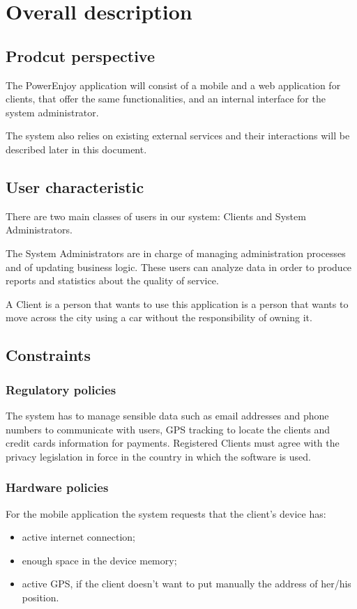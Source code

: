 \chapter{Overall description}

\section{Prodcut perspective}
The PowerEnjoy application will consist of a mobile and a web application for clients, that offer the same functionalities, and an internal interface for the system administrator.

The system also relies on existing external services and their interactions will be described later in this document.

\section{User characteristic}
There are two main classes of users in our system: Clients and System Administrators.

The System Administrators are in charge of managing administration processes and of updating business logic. These users can analyze data in order to produce reports and statistics about the quality of service.

A Client is a person that wants to use this application is a person that wants to move across the city using a car without the responsibility of owning it.

\section{Constraints}

\subsection{Regulatory policies}

The system has to manage sensible data such as email addresses and phone numbers to communicate with users, GPS tracking to locate the clients and credit cards information for payments.
Registered Clients must agree with the privacy legislation in force in the country in which the software is used.

\subsection{Hardware policies}
For the mobile application the system requests that the client’s device has:
\begin{itemize}
\item active internet connection;
\item enough space in the device memory;
\item active GPS, if the client doesn’t want to put manually the address of her/his position.
\end{itemize}

